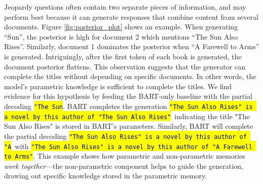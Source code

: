 Jeopardy questions often contain two separate pieces of information, and \ragtoken{} may perform best because it can generate responses that combine content from several documents.
Figure \ref{fig:posterior_plot} shows an example. When generating ``Sun'', the posterior is high for document 2 which mentions ``The Sun Also Rises''.
Similarly, document 1 dominates the posterior when ``A Farewell to Arms'' is generated.
Intriguingly, after the first token of each book is generated, the document posterior flattens. This observation suggests that the generator can complete the titles without depending on specific documents. In other words, the model's parametric knowledge is sufficient to complete the titles.
We find evidence for this hypothesis by feeding the BART-only baseline with the partial decoding \footnotesize\hl{\texttt{"The Sun}}\normalsize.
BART completes the generation 
\footnotesize\hl{\texttt{"The Sun Also Rises" is a novel by this author of "The Sun Also Rises"}}\normalsize \ 
indicating the title "The Sun Also Rises" is stored in BART's parameters. Similarly, BART will complete the partial decoding \footnotesize\hl{\texttt{"The Sun Also Rises" is a novel by this author of "A}}\normalsize\ with \footnotesize\hl{\texttt{"The Sun Also Rises" is a novel by this author of "A Farewell to Arms"}}\normalsize. This example shows how parametric and non-parametric memories \emph{work together}---the non-parametric component helps to guide the generation, drawing out specific knowledge stored in the parametric memory.


